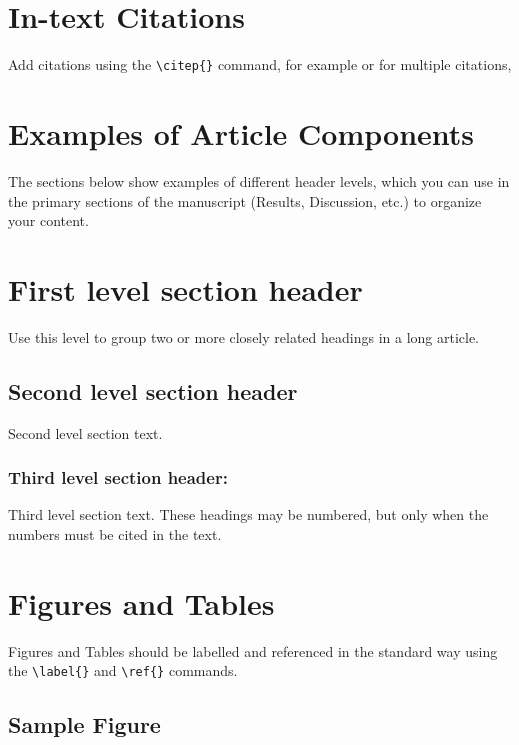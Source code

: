 \documentclass[9pt,twocolumn,twoside]{gsajnl}
\begin{document}
\section*{In-text Citations}

Add citations using the \verb|\citep{}| command, for example \citep{neher2013genealogies} or for multiple citations, \citep{neher2013genealogies, rodelsperger2014characterization}

\section*{Examples of Article Components}
\label{sec:examples}

The sections below show examples of different header levels, which you can use in the primary sections of the manuscript (Results, Discussion, etc.) to organize your content.

\section*{First level section header}

Use this level to group two or more closely related headings in a long article.

\subsection*{Second level section header}

Second level section text.

\subsubsection*{Third level section header:}

Third level section text. These headings may be numbered, but only when the numbers must be cited in the text. 

\section*{Figures and Tables}

Figures and Tables should be labelled and referenced in the standard way using the \verb|\label{}| and \verb|\ref{}| commands.

\subsection*{Sample Figure}
\end{document}
